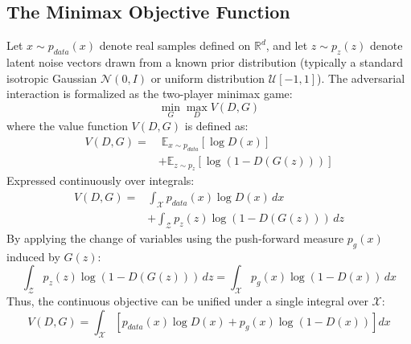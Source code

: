 \documentclass[conference]{IEEEtran}
\begin{document}
\subsection{The Minimax Objective Function}
Let $x \sim p_{data}(x)$ denote real samples defined on $\mathbb{R}^d$, and let $z \sim p_z(z)$ denote latent noise vectors drawn from a known prior distribution (typically a standard isotropic Gaussian $\mathcal{N}(0, I)$ or uniform distribution $\mathcal{U}[-1, 1]$). The adversarial interaction is formalized as the two-player minimax game:
\begin{equation}
\min_G \max_D V(D, G)
\end{equation}
where the value function $V(D, G)$ is defined as:
\begin{align}
V(D, G) = &\; \mathbb{E}_{x \sim p_{data}} [\log D(x)] \nonumber \\
&+ \mathbb{E}_{z \sim p_z} [\log (1 - D(G(z)))]
\label{eq:minimax}
\end{align}
Expressed continuously over integrals:
\begin{align}
V(D, G) = &\int_{\mathcal{X}} p_{data}(x) \log D(x) \, dx \nonumber \\
&+ \int_{\mathcal{Z}} p_z(z) \log(1 - D(G(z))) \, dz
\end{align}
By applying the change of variables using the push-forward measure $p_g(x)$ induced by $G(z)$:
\begin{equation}
\int_{\mathcal{Z}} p_z(z) \log(1 - D(G(z))) \, dz = \int_{\mathcal{X}} p_g(x) \log(1 - D(x)) \, dx
\end{equation}
Thus, the continuous objective can be unified under a single integral over $\mathcal{X}$:
\begin{equation}
V(D, G) = \int_{\mathcal{X}} \left[ p_{data}(x) \log D(x) + p_g(x) \log(1 - D(x)) \right] dx
\label{eq:integral_unified}
\end{equation}
\end{document}
